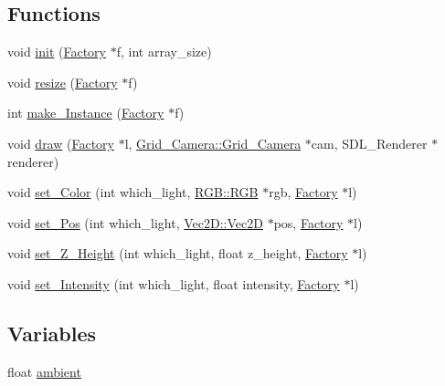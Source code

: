 \subsection*{Functions}
\begin{DoxyCompactItemize}
\item 
void \mbox{\hyperlink{namespace_light_a5d9c82b630767e1d609f572ba5bc4a00}{init}} (\mbox{\hyperlink{struct_light_1_1_factory}{Factory}} $\ast$f, int array\+\_\+size)
\item 
void \mbox{\hyperlink{namespace_light_a117cbec5513fc98e14130f3a55167d06}{resize}} (\mbox{\hyperlink{struct_light_1_1_factory}{Factory}} $\ast$f)
\item 
int \mbox{\hyperlink{namespace_light_a19535d2e02ca847c7a8e2da3b9cb97f8}{make\+\_\+\+Instance}} (\mbox{\hyperlink{struct_light_1_1_factory}{Factory}} $\ast$f)
\item 
void \mbox{\hyperlink{namespace_light_ae13a56b5d4533eefae380ac74c16bf16}{draw}} (\mbox{\hyperlink{struct_light_1_1_factory}{Factory}} $\ast$l, \mbox{\hyperlink{struct_grid___camera_1_1_grid___camera}{Grid\+\_\+\+Camera\+::\+Grid\+\_\+\+Camera}} $\ast$cam, S\+D\+L\+\_\+\+Renderer $\ast$renderer)
\item 
void \mbox{\hyperlink{namespace_light_afa52e975fb44d5c478a16803bef0a3da}{set\+\_\+\+Color}} (int which\+\_\+light, \mbox{\hyperlink{struct_r_g_b_1_1_r_g_b}{R\+G\+B\+::\+R\+GB}} $\ast$rgb, \mbox{\hyperlink{struct_light_1_1_factory}{Factory}} $\ast$l)
\item 
void \mbox{\hyperlink{namespace_light_a12c8f1679ee83b00f2992639286815ec}{set\+\_\+\+Pos}} (int which\+\_\+light, \mbox{\hyperlink{struct_vec2_d_1_1_vec2_d}{Vec2\+D\+::\+Vec2D}} $\ast$pos, \mbox{\hyperlink{struct_light_1_1_factory}{Factory}} $\ast$l)
\item 
void \mbox{\hyperlink{namespace_light_a0f7928ed04593f7efcd4acd950213dc7}{set\+\_\+\+Z\+\_\+\+Height}} (int which\+\_\+light, float z\+\_\+height, \mbox{\hyperlink{struct_light_1_1_factory}{Factory}} $\ast$l)
\item 
void \mbox{\hyperlink{namespace_light_a1b0bd2c6ebb292b30c324136067c8d00}{set\+\_\+\+Intensity}} (int which\+\_\+light, float intensity, \mbox{\hyperlink{struct_light_1_1_factory}{Factory}} $\ast$l)
\end{DoxyCompactItemize}
\subsection*{Variables}
\begin{DoxyCompactItemize}
\item 
float \mbox{\hyperlink{namespace_light_a21c7a12e7bde61498339444442a678f2}{ambient}}
\end{DoxyCompactItemize}


